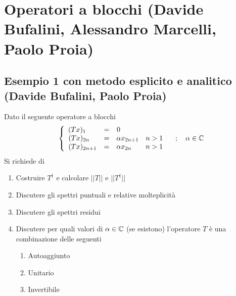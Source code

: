 \newpage

\section{Operatori a blocchi (Davide Bufalini, Alessandro Marcelli, Paolo Proia)}
\subsection{Esempio 1 con metodo esplicito e analitico (Davide Bufalini, Paolo Proia)}
Dato il seguente operatore a blocchi
\begin{align}
	\left\{ \begin{array}{ccc} (Tx)_1 \quad\;\; &= &0 \qquad \qquad \qquad\\ (Tx)_{2n} \quad &= &\alpha x_{2n+1} \quad n> 1\\ (Tx)_{2n+1} &= &\alpha x_{2n} \quad\quad n> 1 \end{array} \right. \quad ; \quad \alpha \in \mathbb{C}
\end{align}
Si richiede di
\begin{enumerate}
	\item Costruire $T^\dagger$ e calcolare $||T||$ e  $||T^\dagger||$
	\item Discutere gli spettri puntuali e relative molteplicità
	\item Discutere gli spettri residui
	\item Discutere per quali valori di $\alpha \in \mathbb{C}$ (se esistono) l'operatore $T$ è una combinazione delle seguenti
	\begin{enumerate}
		\item Autoaggiunto
		\item Unitario
		\item Invertibile
	\end{enumerate}
\end{enumerate}

